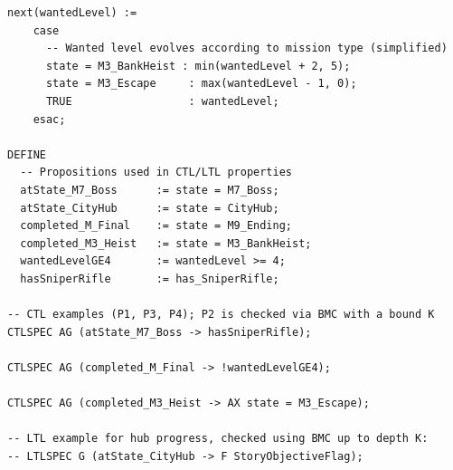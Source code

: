 \documentclass[conference]{IEEEtran}
\begin{document}
\begin{lstlisting}[style=UBListing,caption={Sketch of SMV encoding generated from the exported story graph.},label={lst:smv-encoding}]
  next(wantedLevel) :=
    case
      -- Wanted level evolves according to mission type (simplified)
      state = M3_BankHeist : min(wantedLevel + 2, 5);
      state = M3_Escape     : max(wantedLevel - 1, 0);
      TRUE                  : wantedLevel;
    esac;

DEFINE
  -- Propositions used in CTL/LTL properties
  atState_M7_Boss      := state = M7_Boss;
  atState_CityHub      := state = CityHub;
  completed_M_Final    := state = M9_Ending;
  completed_M3_Heist   := state = M3_BankHeist;
  wantedLevelGE4       := wantedLevel >= 4;
  hasSniperRifle       := has_SniperRifle;

-- CTL examples (P1, P3, P4); P2 is checked via BMC with a bound K
CTLSPEC AG (atState_M7_Boss -> hasSniperRifle);

CTLSPEC AG (completed_M_Final -> !wantedLevelGE4);

CTLSPEC AG (completed_M3_Heist -> AX state = M3_Escape);

-- LTL example for hub progress, checked using BMC up to depth K:
-- LTLSPEC G (atState_CityHub -> F StoryObjectiveFlag);
\end{lstlisting}

\fi



\end{document}
